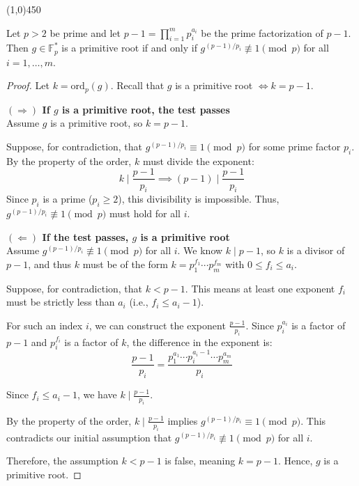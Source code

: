 \begin{center}
    \vspace{10pt}
    \line(1,0){450}
    \vspace{25pt}
\end{center}

\begin{lemma}
    Let $p>2$ be prime and let $p-1 = \prod_{i=1}^{m}p_{i}^{a_{i}}$ be the prime factorization of $p-1$.
    Then $g \in \mathbb{F}_{p}^{*}$ is a primitive root if and only if $g^{(p-1)/p_{i}} \not\equiv 1 \pmod{p}$ for all $i=1, \dots, m$.
\end{lemma}

\begin{proof}
    Let $k = \text{ord}_{p}(g)$. Recall that $g$ is a primitive root $\iff k = p-1$.
    
    \textbf{$(\Rightarrow)$ If $g$ is a primitive root, the test passes} \\
    Assume $g$ is a primitive root, so $k = p-1$.
    
    Suppose, for contradiction, that $g^{(p-1)/p_{i}} \equiv 1 \pmod{p}$ for some prime factor $p_i$.
    By the property of the order, $k$ must divide the exponent:
    $$k \mid \frac{p-1}{p_{i}} \implies (p-1) \mid \frac{p-1}{p_{i}}$$
    Since $p_i$ is a prime ($p_i \ge 2$), this divisibility is impossible.
    Thus, $g^{(p-1)/p_{i}} \not\equiv 1 \pmod{p}$ must hold for all $i$.

    \textbf{$(\Leftarrow)$ If the test passes, $g$ is a primitive root} \\
    Assume $g^{(p-1)/p_{i}} \not\equiv 1 \pmod{p}$ for all $i$.
    We know $k \mid p-1$, so $k$ is a divisor of $p-1$, and thus $k$ must be of the form $k = p_{1}^{f_{1}} \cdots p_{m}^{f_{m}}$ with $0 \le f_{i} \le a_{i}$.
    
    Suppose, for contradiction, that $k < p-1$. This means at least one exponent $f_i$ must be strictly less than $a_i$ (i.e., $f_i \le a_i - 1$).
    
    For such an index $i$, we can construct the exponent $\frac{p-1}{p_{i}}$. Since $p_i^{a_i}$ is a factor of $p-1$ and $p_i^{f_i}$ is a factor of $k$, the difference in the exponent is:
    $$\frac{p-1}{p_{i}} = \frac{p_{1}^{a_{1}} \cdots p_{i}^{a_{i}-1} \cdots p_{m}^{a_{m}}}{p_{i}}$$
    
    Since $f_i \le a_i - 1$, we have $k \mid \frac{p-1}{p_{i}}$.
    
    By the property of the order, $k \mid \frac{p-1}{p_{i}}$ implies $g^{(p-1)/p_{i}} \equiv 1 \pmod{p}$.
    This contradicts our initial assumption that $g^{(p-1)/p_{i}} \not\equiv 1 \pmod{p}$ for all $i$.
    
    Therefore, the assumption $k < p-1$ is false, meaning $k = p-1$. Hence, $g$ is a primitive root. \qedhere
\end{proof}

